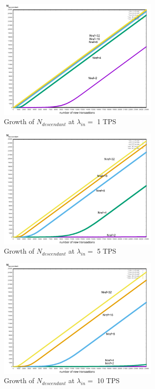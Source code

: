 \documentclass[a4paper,10pt,twocolumn]{article}
\begin{document}
 \begin{figure}[ht]
	\begin{center}
		\includegraphics[width=80mm]{1sec_ref.png}
		\caption{Growth of \(N_{descendant}\)  at \( \lambda_{in}=\) 1 TPS}
	  \label{fig:sec1_ref}
	\end{center}
 \end{figure}


 \begin{figure}[ht]
	\begin{center}
		\includegraphics[width=80mm]{5sec_ref.png}
		\caption{Growth of \(N_{descendant}\)  at \( \lambda_{in}=\) 5  TPS}
	  \label{fig:sec5_ref}
	\end{center}
 \end{figure}

 \begin{figure}[ht]
	\begin{center}
		\includegraphics[width=80mm]{10sec_ref.png}
		\caption{Growth of \(N_{descendant}\) at \( \lambda_{in}=\) 10 TPS}
	  \label{fig:sec10_ref}
	\end{center}
 \end{figure}
 
 
  
\end{document}
